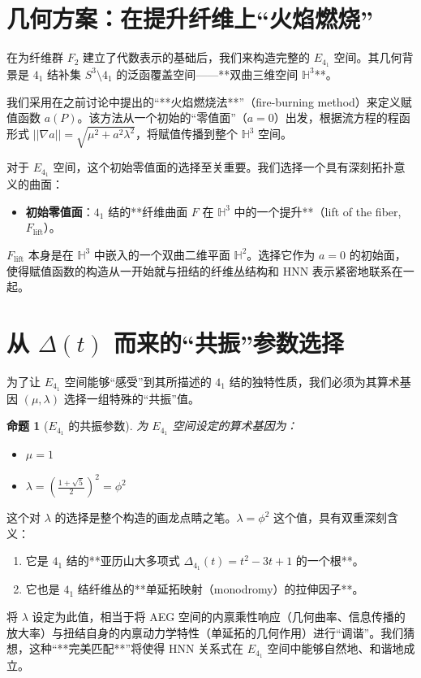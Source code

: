 \documentclass[a4paper,12pt]{book}
\numberwithin{problem}{section}
\numberwithin{definition}{section}
\numberwithin{lemma}{section}
\newtheorem{proposition}{命题}
\numberwithin{proposition}{section}
\numberwithin{theorem}{section}
\numberwithin{grammar}{section}
\numberwithin{program}{section}
\numberwithin{convention}{section}
\numberwithin{corollary}{section}
\begin{document}
\section{几何方案：在提升纤维上“火焰燃烧”}
\label{sec:e41_fire_burning}

在为纤维群 $F_2$ 建立了代数表示的基础后，我们来构造完整的 $E_{4_1}$ 空间。其几何背景是 $4_1$ 结补集 $S^3 \setminus 4_1$ 的泛函覆盖空间——**双曲三维空间 $\mathbb{H}^3$**。

我们采用在之前讨论中提出的“**火焰燃烧法**”（fire-burning method）来定义赋值函数 $a(P)$。该方法从一个初始的“零值面”（$a=0$）出发，根据流方程的程函形式 $||\nabla a|| = \sqrt{\mu^2 + a^2 \lambda^2}$，将赋值传播到整个 $\mathbb{H}^3$ 空间。

对于 $E_{4_1}$ 空间，这个初始零值面的选择至关重要。我们选择一个具有深刻拓扑意义的曲面：
\begin{itemize}
    \item \textbf{初始零值面}：$4_1$ 结的**纤维曲面 $F$ 在 $\mathbb{H}^3$ 中的一个提升**（lift of the fiber, $F_{\text{lift}}$）。
\end{itemize}
$F_{\text{lift}}$ 本身是在 $\mathbb{H}^3$ 中嵌入的一个双曲二维平面 $\mathbb{H}^2$。选择它作为 $a=0$ 的初始面，使得赋值函数的构造从一开始就与扭结的纤维丛结构和 HNN 表示紧密地联系在一起。

\section{从 \texorpdfstring{$\Delta(t)$}{Δ(t)} 而来的“共振”参数选择}
\label{sec:e41_resonant_parameters}

为了让 $E_{4_1}$ 空间能够“感受”到其所描述的 $4_1$ 结的独特性质，我们必须为其算术基因 $(\mu, \lambda)$ 选择一组特殊的“共振”值。

\begin{proposition}[$E_{4_1}$ 的共振参数]
    \label{prop:resonant_parameters}
    为 $E_{4_1}$ 空间设定的算术基因为：
    \begin{itemize}
        \item $\mu = 1$
        \item $\lambda = \left(\frac{1+\sqrt{5}}{2}\right)^2 = \phi^2$
    \end{itemize}
\end{proposition}

这个对 $\lambda$ 的选择是整个构造的画龙点睛之笔。$\lambda = \phi^2$ 这个值，具有双重深刻含义：
\begin{enumerate}
    \item 它是 $4_1$ 结的**亚历山大多项式 $\Delta_{4_1}(t) = t^2 - 3t + 1$ 的一个根**。
    \item 它也是 $4_1$ 结纤维丛的**单延拓映射（monodromy）的拉伸因子**。
\end{enumerate}
将 $\lambda$ 设定为此值，相当于将 AEG 空间的内禀乘性响应（几何曲率、信息传播的放大率）与扭结自身的内禀动力学特性（单延拓的几何作用）进行“调谐”。我们猜想，这种“**完美匹配**”将使得 HNN 关系式在 $E_{4_1}$ 空间中能够自然地、和谐地成立。
\end{document}
